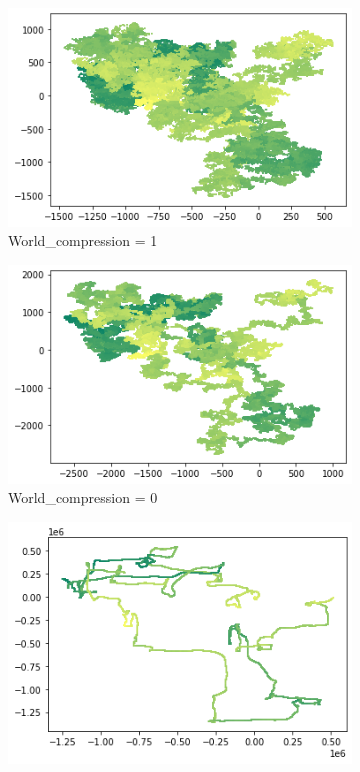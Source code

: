 \documentclass[8pt,letterpaper]{article}
\begin{document}
\begin{figure}[!h]
\centering

	\begin{subfigure}[b]{0.32\textwidth}
		\centering
		\includegraphics[width=\textwidth]{Images/fat_landmass1.png}
		\caption{World\_compression = 1}
	\end{subfigure}
	\begin{subfigure}[b]{0.32\textwidth}
		\centering
		\includegraphics[width=\textwidth]{Images/diet_landmass1.png}
		\caption{World\_compression = 0}
	\end{subfigure}
	\begin{subfigure}[b]{0.32\textwidth}
		\centering
		\includegraphics[width=\textwidth]{Images/skinny_landmass1.png}

\end{subfigure}
\end{figure}
\end{document}
